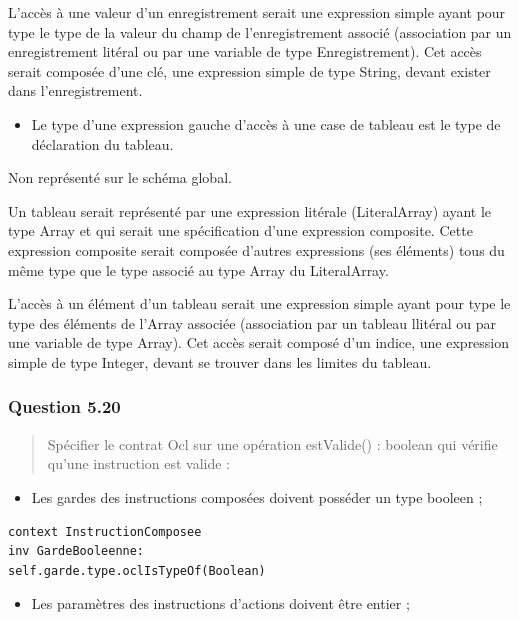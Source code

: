\documentclass[]{article}
\providecommand{\tightlist}{%
  \setlength{\itemsep}{0pt}\setlength{\parskip}{0pt}}
\begin{document}
L'accès à une valeur d'un enregistrement serait une expression simple
ayant pour type le type de la valeur du champ de l'enregistrement
associé (association par un enregistrement litéral ou par une variable
de type Enregistrement). Cet accès serait composée d'une clé, une
expression simple de type String, devant exister dans l'enregistrement.

\begin{itemize}
\tightlist
\item
  Le type d'une expression gauche d'accès à une case de tableau est le
  type de déclaration du tableau.
\end{itemize}

Non représenté sur le schéma global.

Un tableau serait représenté par une expression litérale (LiteralArray)
ayant le type Array et qui serait une spécification d'une expression
composite. Cette expression composite serait composée d'autres
expressions (ses éléments) tous du même type que le type associé au type
Array du LiteralArray.

L'accès à un élément d'un tableau serait une expression simple ayant
pour type le type des éléments de l'Array associée (association par un
tableau llitéral ou par une variable de type Array). Cet accès serait
composé d'un indice, une expression simple de type Integer, devant se
trouver dans les limites du tableau.

\hypertarget{question-5.20}{%
\subsubsection{Question 5.20}\label{question-5.20}}

\begin{quote}
Spécifier le contrat Ocl sur une opération estValide() : boolean qui
vérifie qu'une instruction est valide :
\end{quote}

\begin{itemize}
\tightlist
\item
  Les gardes des instructions composées doivent posséder un type booleen
  ;
\end{itemize}

\begin{verbatim}
context InstructionComposee
inv GardeBooleenne:
self.garde.type.oclIsTypeOf(Boolean)
\end{verbatim}

\begin{itemize}
\tightlist
\item
  Les paramètres des instructions d'actions doivent être entier ;
\end{itemize}
\end{document}

